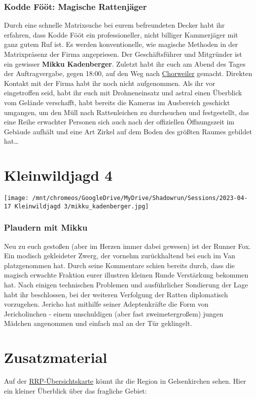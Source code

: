 \documentclass{ShadowTeXSR5}
\begin{document}
\hypertarget{kodde-fuxf6uxf6t-magische-rattenjuxe4ger}{%
\subsubsection{Kodde Fööt: Magische Rattenjäger}\label{kodde-fuxf6uxf6t-magische-rattenjuxe4ger}}
Durch eine schnelle Matrixsuche bei eurem befreundeten Decker habt ihr erfahren, dass Kodde Fööt ein professioneller, nicht billiger Kammerjäger mit ganz gutem Ruf ist. Es werden konventionelle, wie magische Methoden in der Matrixpräsenz der Firma angepriesen. Der Geschäftsführer und Mitgründer ist ein gewisser \textbf{Mikku Kadenberger}.
Zuletzt habt ihr euch am Abend des Tages der Auftragvergabe, gegen 18:00, auf den Weg nach
\href{https://www.google.com/maps/d/viewer?mid=1LAs03Ps-kPhd6v7WgEsD6yqa0XnqBms\&ll=51.020533411852696\%2C6.863011874067486\&z=15}{Chorweiler} gemacht. Direkten Kontakt mit der Firma habt ihr noch nicht aufgenommen. Als ihr vor eingetroffen seid, habt ihr euch mit Drohneneinsatz und astral einen Überblick vom Gelände verschafft, habt bereits die Kameras im Ausbereich geschickt umgangen, um den Müll nach Rattenleichen zu durchsuchen und festgestellt, das eine Reihe erwachter Personen sich auch nach der offiziellen Öffnungszeit im Gebäude aufhält und eine Art Zirkel auf dem Boden des größten Raumes gebildet hat\ldots{}

\newpage
\hypertarget{kleinwildjagd-4}{\section{Kleinwildjagd 4}\label{kleinwildjagd-4}}
\texttt{[image: /mnt/chromeos/GoogleDrive/MyDrive/Shadowrun/Sessions/2023-04-17 Kleinwildjagd 3/mikku\_kadenberger.jpg]}
\hypertarget{plaudern-mit-mikku}{\subsubsection{Plaudern mit Mikku}\label{plaudern-mit-mikku}}
Neu zu euch gestoßen (aber im Herzen immer dabei gewesen) ist der Runner Fox. Ein modisch gekleideter Zwerg, der vornehm zurückhaltend bei euch im Van platzgenommen hat. Durch seine Kommentare schien bereits durch, dass die magisch erwachte Fraktion eurer illustren kleinen Runde Verstärkung bekommen hat.
Nach einigen technischen Problemen und ausführlicher Sondierung der Lage habt ihr beschlossen, bei der weiteren Verfolgung der Ratten diplomatisch vorzugehen. Jericho hat mithilfe seiner Adeptenkräfte die Form von Jericholinchen - einem unschuldigen (aber fast zweimetergroßem) jungen Mädchen angenommen und einfach mal an der Tür geklingelt.

\newpage
\hypertarget{zusuxe4tzliches-material}{%
\section{Zusatzmaterial}\label{zusuxe4tzliches-material}}
Auf der \href{https://www.google.com/maps/d/edit?mid=1LAs03Ps-kPhd6v7WgEsD6yqa0XnqBms\&usp=sharing}{RRP-Übersichtskarte} könnt ihr die Region in Gelsenkirchen sehen. Hier ein kleiner Überblick über das fragliche Gebiet:
\end{document}
